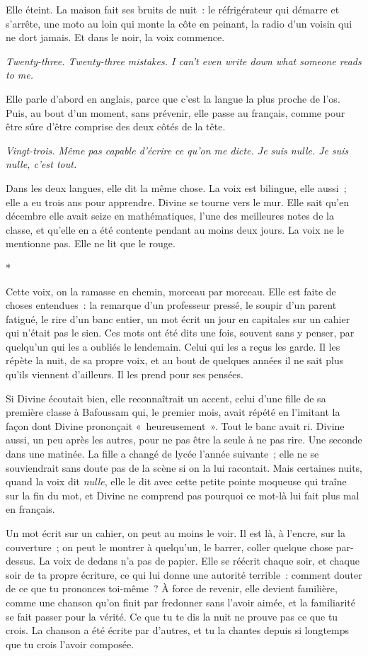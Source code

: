 \documentclass[10.5pt,twoside,openright]{book}
\newcommand{\asterisme}{\par\vspace{0.7em}\centerline{\color{gris}*\quad*\quad*}\vspace{0.7em}\par\noindent}
\begin{document}
Elle éteint. La maison fait ses bruits de nuit : le réfrigérateur qui démarre et s’arrête, une moto au loin qui monte la côte en peinant, la radio d’un voisin qui ne dort jamais. Et dans le noir, la voix commence.

\emph{Twenty-three. Twenty-three mistakes. I can’t even write down what someone reads to me.}

Elle parle d’abord en anglais, parce que c’est la langue la plus proche de l’os. Puis, au bout d’un moment, sans prévenir, elle passe au français, comme pour être sûre d’être comprise des deux côtés de la tête.

\emph{Vingt-trois. Même pas capable d’écrire ce qu’on me dicte. Je suis nulle. Je suis nulle, c’est tout.}

Dans les deux langues, elle dit la même chose. La voix est bilingue, elle aussi ; elle a eu trois ans pour apprendre. Divine se tourne vers le mur. Elle sait qu’en décembre elle avait seize en mathématiques, l’une des meilleures notes de la classe, et qu’elle en a été contente pendant au moins deux jours. La voix ne le mentionne pas. Elle ne lit que le rouge.

\asterisme

Cette voix, on la ramasse en chemin, morceau par morceau. Elle est faite de choses entendues : la remarque d’un professeur pressé, le soupir d’un parent fatigué, le rire d’un banc entier, un mot écrit un jour en capitales sur un cahier qui n’était pas le sien. Ces mots ont été dits une fois, souvent sans y penser, par quelqu’un qui les a oubliés le lendemain. Celui qui les a reçus les garde. Il les répète la nuit, de sa propre voix, et au bout de quelques années il ne sait plus qu’ils viennent d’ailleurs. Il les prend pour ses pensées.

Si Divine écoutait bien, elle reconnaîtrait un accent, celui d’une fille de sa première classe à Bafoussam qui, le premier mois, avait répété en l’imitant la façon dont Divine prononçait « heureusement ». Tout le banc avait ri. Divine aussi, un peu après les autres, pour ne pas être la seule à ne pas rire. Une seconde dans une matinée. La fille a changé de lycée l’année suivante ; elle ne se souviendrait sans doute pas de la scène si on la lui racontait. Mais certaines nuits, quand la voix dit \emph{nulle}, elle le dit avec cette petite pointe moqueuse qui traîne sur la fin du mot, et Divine ne comprend pas pourquoi ce mot-là lui fait plus mal en français.

Un mot écrit sur un cahier, on peut au moins le voir. Il est là, à l’encre, sur la couverture ; on peut le montrer à quelqu’un, le barrer, coller quelque chose par-dessus. La voix de dedans n’a pas de papier. Elle se réécrit chaque soir, et chaque soir de ta propre écriture, ce qui lui donne une autorité terrible : comment douter de ce que tu prononces toi-même ? À force de revenir, elle devient familière, comme une chanson qu’on finit par fredonner sans l’avoir aimée, et la familiarité se fait passer pour la vérité. Ce que tu te dis la nuit ne prouve pas ce que tu crois. La chanson a été écrite par d’autres, et tu la chantes depuis si longtemps que tu crois l’avoir composée.
\end{document}
